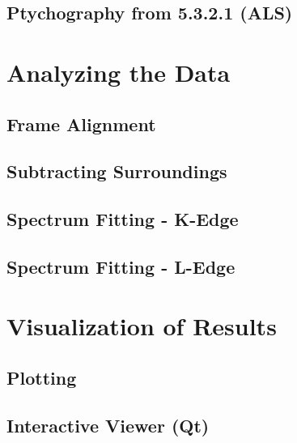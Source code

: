 \documentclass[letterpaper,10pt,english]{sphinxmanual}
\begin{document}
\section{Ptychography from 5.3.2.1 (ALS)}
\label{\detokenize{importing:ptychography-from-5-3-2-1-als}}

\chapter{Analyzing the Data}
\label{\detokenize{analysis::doc}}\label{\detokenize{analysis:analyzing-the-data}}

\section{Frame Alignment}
\label{\detokenize{analysis:frame-alignment}}

\section{Subtracting Surroundings}
\label{\detokenize{analysis:subtracting-surroundings}}

\section{Spectrum Fitting - K-Edge}
\label{\detokenize{analysis:spectrum-fitting-k-edge}}

\section{Spectrum Fitting - L-Edge}
\label{\detokenize{analysis:spectrum-fitting-l-edge}}

\chapter{Visualization of Results}
\label{\detokenize{visualization::doc}}\label{\detokenize{visualization:visualization-of-results}}

\section{Plotting}
\label{\detokenize{visualization:plotting}}

\section{Interactive Viewer (Qt)}
\label{\detokenize{visualization:interactive-viewer-qt}}
\end{document}

